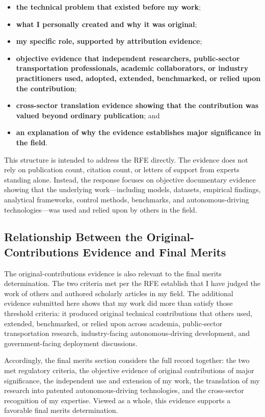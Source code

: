\documentclass[11pt,letterpaper]{article}
\begin{document}
\begin{itemize}
\item \textbf{the technical problem that existed before my work};
\item \textbf{what I personally created and why it was original};
\item \textbf{my specific role, supported by attribution evidence};
\item \textbf{objective evidence that independent researchers, public-sector transportation professionals, academic collaborators, or industry practitioners used, adopted, extended, benchmarked, or relied upon the contribution};
\item \textbf{cross-sector translation evidence showing that the contribution was valued beyond ordinary publication}; and
\item \textbf{an explanation of why the evidence establishes major significance in the field}.
\end{itemize}

This structure is intended to address the RFE directly. The evidence does not rely on publication count, citation count, or letters of support from experts standing alone. Instead, the response focuses on objective documentary evidence showing that the underlying work---including models, datasets, empirical findings, analytical frameworks, control methods, benchmarks, and autonomous-driving technologies---was used and relied upon by others in the field.

\subsection{Relationship Between the Original-Contributions Evidence and Final Merits}

The original-contributions evidence is also relevant to the final merits determination. The two criteria met per the RFE establish that I have judged the work of others and authored scholarly articles in my field. The additional evidence submitted here shows that my work did more than satisfy those threshold criteria: it produced original technical contributions that others used, extended, benchmarked, or relied upon across academia, public-sector transportation research, industry-facing autonomous-driving development, and government-facing deployment discussions.

Accordingly, the final merits section considers the full record together: the two met regulatory criteria, the objective evidence of original contributions of major significance, the independent use and extension of my work, the translation of my research into patented autonomous-driving technologies, and the cross-sector recognition of my expertise. Viewed as a whole, this evidence supports a favorable final merits determination.
\end{document}
